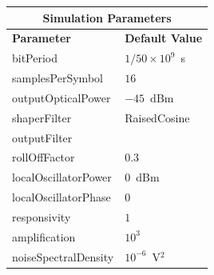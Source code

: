 \begin{refsection}
\begin{table}[H]
	\centering
	\footnotesize
	\begin{tabular}{|l|l|}
		\hline
		\multicolumn{2}{|c|}{ \textbf{Simulation Parameters} } \\
		\hline
		\textbf{Parameter}     & \textbf{Default Value}                                     \\\hline
		bitPeriod              & $1/50\times10^9$~s														\\\hline
		samplesPerSymbol       & $16$                                                       \\\hline
		outputOpticalPower     & $-45$~dBm 													\\ \hline
		shaperFilter	       & RaisedCosine												\\ \hline
		outputFilter		   &                     										\\ \hline
		rollOffFactor		   & 0.3														\\ \hline
		localOscillatorPower   & $0$~dBm                                                    \\ \hline
		localOscillatorPhase   & $0$                                                        \\ \hline
		responsivity           & $1$                                                        \\ \hline
		amplification          & $10^3$                                                     \\ \hline
		noiseSpectralDensity   & $10^{-6}$~V$^2$                             					\\ \hline

\end{tabular}
\end{table}
\end{refsection}
